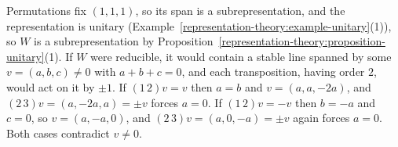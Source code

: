 \begin{solution}
Permutations fix $(1, 1, 1)$, so its span is a subrepresentation, and the representation is unitary (Example~\ref{representation-theory:example-unitary}(1)), so $W$ is a subrepresentation by
Proposition~\ref{representation-theory:proposition-unitary}(1). If $W$ were reducible, it would contain a stable line spanned by some $v = (a, b, c) \neq 0$ with $a + b + c = 0$, and each
transposition, having order $2$, would act on it by $\pm1$. If $(1\,2)v = v$ then $a = b$ and $v = (a, a, -2a)$, and $(2\,3)v = (a, -2a, a) = \pm v$ forces $a = 0$. If $(1\,2)v = -v$ then
$b = -a$ and $c = 0$, so $v = (a, -a, 0)$, and $(2\,3)v = (a, 0, -a) = \pm v$ again forces $a = 0$. Both cases contradict $v \neq 0$.
\end{solution}
